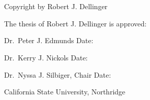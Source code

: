 \documentclass[
  12pt,
]{article}
\begin{document}
\section*{}

\vfill

\begin{center}
Copyright by Robert J. Dellinger
\end{center}

\newpage

The thesis of Robert J. Dellinger is approved:

\vspace{1.5in}

\underline{\hspace{2.5in}}\hspace{0.5in} \underline{\hspace{2in}}

Dr.~Peter J. Edmunds \hspace{1.65in} Date:

\vspace{0.5in}

\underline{\hspace{2.5in}}\hspace{0.5in} \underline{\hspace{2in}}

Dr.~Kerry J. Nickols \hspace{1.75in} Date:

\vspace{0.5in}

\underline{\hspace{2.5in}}\hspace{0.5in} \underline{\hspace{2in}}

Dr.~Nyssa J. Silbiger, Chair \hspace{1.3in} Date:

\vfill

\begin{center}
California State University, Northridge
\end{center}

\newpage

\vspace*{\fill}
\end{document}
